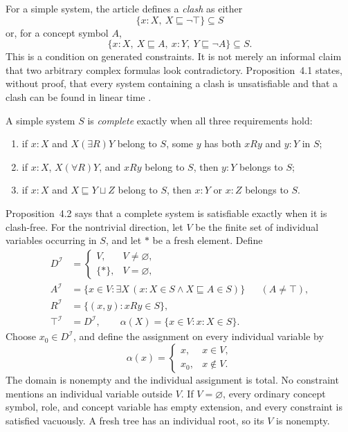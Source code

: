 For a simple system, the article defines a \emph{clash} as either
\[
 \{x:X,\ X\sqsubseteq\neg\top\}\subseteq S
\]
or, for a concept symbol \(A\),
\[
 \{x:X,\ X\sqsubseteq A,\ x:Y,\ Y\sqsubseteq\neg A\}\subseteq S.
\]
This is a condition on generated constraints.  It is not merely an informal
claim that two arbitrary complex formulas look contradictory.
Proposition~4.1 states, without proof, that every system containing a clash is
unsatisfiable and that a clash can be found in linear time
\cite[\S4, p.~11]{SchmidtSchaussSmolka1991}.

A simple system \(S\) is \emph{complete} exactly when all three requirements
hold:
\begin{enumerate}
\item if \(x:X\) and \(X(\exists R)Y\) belong to \(S\), some \(y\) has both
      \(xRy\) and \(y:Y\) in \(S\);
\item if \(x:X\), \(X(\forall R)Y\), and \(xRy\) belong to \(S\), then
      \(y:Y\) belongs to \(S\);
\item if \(x:X\) and \(X\sqsubseteq Y\sqcup Z\) belong to \(S\), then
      \(x:Y\) or \(x:Z\) belongs to \(S\).
\end{enumerate}
Proposition~4.2 says that a complete system is satisfiable exactly when it is
clash-free.  For the nontrivial direction, let \(V\) be the finite set of
individual variables occurring in \(S\), and let \(\ast\) be a fresh element.
Define
\[
\begin{aligned}
 D^{\mathcal I}
   &=
   \begin{cases}
    V,&V\ne\varnothing,\\
    \{\ast\},&V=\varnothing,
   \end{cases}\\
 A^{\mathcal I}
   &=\{x\in V:\exists X\,
          (x:X\in S\land X\sqsubseteq A\in S)\}
      &&(A\ne\top),\\
 R^{\mathcal I}
   &=\{(x,y):xRy\in S\},\\
 \top^{\mathcal I}&=D^{\mathcal I},\qquad
 \alpha(X)=\{x\in V:x:X\in S\}.
\end{aligned}
\]
Choose \(x_0\in D^{\mathcal I}\), and define the assignment on every
individual variable by
\[
 \alpha(x)=
 \begin{cases}
  x,&x\in V,\\
  x_0,&x\notin V.
 \end{cases}
\]
The domain is nonempty and the individual assignment is total.
No constraint mentions an individual variable outside \(V\).
If \(V=\varnothing\), every ordinary concept symbol, role, and concept
variable has empty extension, and every constraint is satisfied vacuously.
A fresh tree has an individual root, so its \(V\) is nonempty.

